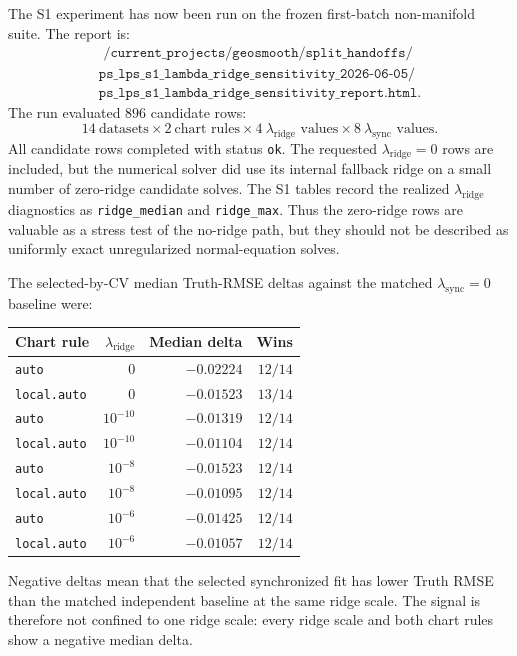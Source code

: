 \documentclass[11pt]{article}
\begin{document}
The S1 experiment has now been run on the frozen first-batch non-manifold
suite.  The report is:
\[
\begin{gathered}
  \texttt{~/current\_projects/geosmooth/split\_handoffs/}\\
  \texttt{ps\_lps\_s1\_lambda\_ridge\_sensitivity\_2026-06-05/}\\
  \texttt{ps\_lps\_s1\_lambda\_ridge\_sensitivity\_report.html}.
\end{gathered}
\]
The run evaluated \(896\) candidate rows:
\[
  14\ \text{datasets}
  \times 2\ \text{chart rules}
  \times 4\ \lambda_{\mathrm{ridge}}\text{ values}
  \times 8\ \lambda_{\mathrm{sync}}\text{ values}.
\]
All candidate rows completed with status \texttt{ok}.  The requested
\(\lambda_{\mathrm{ridge}}=0\) rows are included, but the numerical solver did
use its internal fallback ridge on a small number of zero-ridge candidate
solves.  The S1 tables record the realized \(\lambda_{\mathrm{ridge}}\)
diagnostics as \texttt{ridge\_median} and \texttt{ridge\_max}.  Thus the
zero-ridge rows are valuable as a stress test of the no-ridge path, but they
should not be described as uniformly exact unregularized normal-equation solves.

The selected-by-CV median Truth-RMSE deltas against the matched
\(\lambda_{\mathrm{sync}}=0\) baseline were:
\begin{center}
\begin{tabular}{@{}lrrr@{}}
\toprule
Chart rule & \(\lambda_{\mathrm{ridge}}\) & Median delta & Wins \\
\midrule
\texttt{auto} & \(0\) & \(-0.02224\) & \(12/14\) \\
\texttt{local.auto} & \(0\) & \(-0.01523\) & \(13/14\) \\
\texttt{auto} & \(10^{-10}\) & \(-0.01319\) & \(12/14\) \\
\texttt{local.auto} & \(10^{-10}\) & \(-0.01104\) & \(12/14\) \\
\texttt{auto} & \(10^{-8}\) & \(-0.01523\) & \(12/14\) \\
\texttt{local.auto} & \(10^{-8}\) & \(-0.01095\) & \(12/14\) \\
\texttt{auto} & \(10^{-6}\) & \(-0.01425\) & \(12/14\) \\
\texttt{local.auto} & \(10^{-6}\) & \(-0.01057\) & \(12/14\) \\
\bottomrule
\end{tabular}
\end{center}
Negative deltas mean that the selected synchronized fit has lower Truth RMSE
than the matched independent baseline at the same ridge scale.  The signal is
therefore not confined to one ridge scale: every ridge scale and both chart
rules show a negative median delta.
\end{document}
